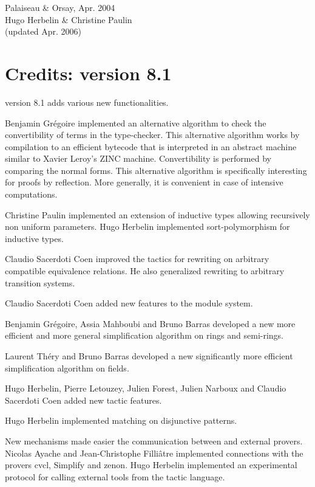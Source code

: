 \begin{flushright}
Palaiseau \& Orsay, Apr. 2004\\
Hugo Herbelin \& Christine Paulin\\
(updated Apr. 2006)
\end{flushright}

\section*{Credits: version 8.1}

{\Coq} version 8.1 adds various new functionalities.

Benjamin Grégoire implemented an alternative algorithm to check the
convertibility of terms in the {\Coq} type-checker. This alternative
algorithm works by compilation to an efficient bytecode that is
interpreted in an abstract machine similar to Xavier Leroy's ZINC
machine.  Convertibility is performed by comparing the normal
forms. This alternative algorithm is specifically interesting for
proofs by reflection. More generally, it is convenient in case of
intensive computations.

Christine Paulin implemented an extension of inductive types allowing
recursively non uniform parameters. Hugo Herbelin implemented
sort-polymorphism for inductive types.

Claudio Sacerdoti Coen improved the tactics for rewriting on arbitrary
compatible equivalence relations. He also generalized rewriting to
arbitrary transition systems.

Claudio Sacerdoti Coen added new features to the module system. 

Benjamin Grégoire, Assia Mahboubi and Bruno Barras developed a new
more efficient and more general simplification algorithm on rings and
semi-rings.

Laurent Théry and Bruno Barras developed a new significantly more efficient
simplification algorithm on fields.

Hugo Herbelin, Pierre Letouzey, Julien Forest, Julien Narboux and
Claudio Sacerdoti Coen added new tactic features.

Hugo Herbelin implemented matching on disjunctive patterns.

New mechanisms made easier the communication between {\Coq} and external
provers. Nicolas Ayache and Jean-Christophe Filliâtre implemented
connections with the provers {\sc cvcl}, {\sc Simplify} and {\sc
zenon}. Hugo Herbelin implemented an experimental protocol for calling
external tools from the tactic language.


